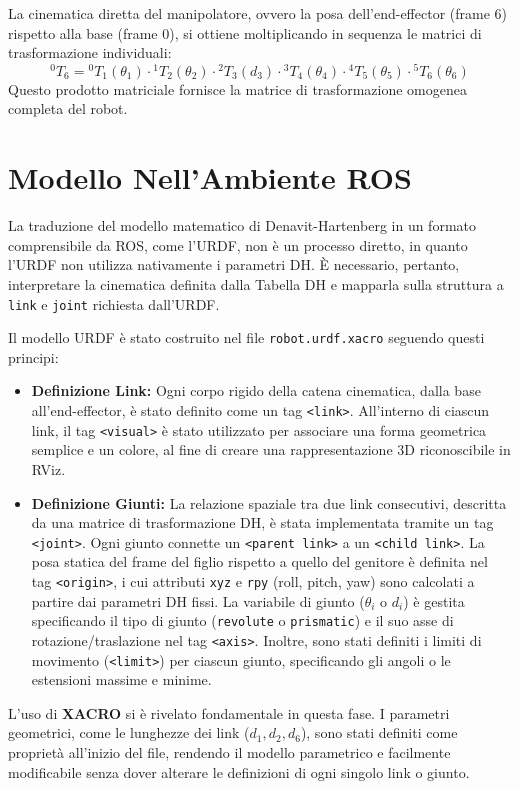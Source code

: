 \documentclass[11pt, a4paper]{report}
\begin{document}
La cinematica diretta del manipolatore, ovvero la posa dell'end-effector (frame 6) rispetto alla base (frame 0), si ottiene moltiplicando in sequenza le matrici di trasformazione individuali:
\[
    ^{0}T_6 = {^{0}T_1}(\theta_1) \cdot {^{1}T_2}(\theta_2) \cdot {^{2}T_3}(d_3) \cdot {^{3}T_4}(\theta_4) \cdot {^{4}T_5}(\theta_5) \cdot {^{5}T_6}(\theta_6)
\]
Questo prodotto matriciale fornisce la matrice di trasformazione omogenea completa del robot.
\newpage
\section{Modello Nell'Ambiente ROS}
\label{sec:implementazione_ros}

La traduzione del modello matematico di Denavit-Hartenberg in un formato comprensibile da ROS, come l'URDF, non è un processo diretto, in quanto l'URDF non utilizza nativamente i parametri DH. È necessario, pertanto, interpretare la cinematica definita dalla Tabella DH e mapparla sulla struttura a \texttt{link} e \texttt{joint} richiesta dall'URDF.

Il modello URDF è stato costruito nel file \texttt{robot.urdf.xacro} seguendo questi principi:
\begin{itemize}
    \item \textbf{Definizione Link:} Ogni corpo rigido della catena cinematica, dalla base all'end-effector, è stato definito come un tag \texttt{<link>}. All'interno di ciascun link, il tag \texttt{<visual>} è stato utilizzato per associare una forma geometrica semplice e un colore, al fine di creare una rappresentazione 3D riconoscibile in RViz.
    \item \textbf{Definizione Giunti:} La relazione spaziale tra due link consecutivi, descritta da una matrice di trasformazione DH, è stata implementata tramite un tag \texttt{<joint>}. Ogni giunto connette un \texttt{<parent link>} a un \texttt{<child link>}. La posa statica del frame del figlio rispetto a quello del genitore è definita nel tag \texttt{<origin>}, i cui attributi \texttt{xyz} e \texttt{rpy} (roll, pitch, yaw) sono calcolati a partire dai parametri DH fissi. La variabile di giunto (\(\theta_i\) o \(d_i\)) è gestita specificando il tipo di giunto (\texttt{revolute} o \texttt{prismatic}) e il suo asse di rotazione/traslazione nel tag \texttt{<axis>}. Inoltre, sono stati definiti i limiti di movimento (\texttt{<limit>}) per ciascun giunto, specificando gli angoli o le estensioni massime e minime.
\end{itemize}
L'uso di \textbf{XACRO} si è rivelato fondamentale in questa fase. I parametri geometrici, come le lunghezze dei link (\(d_1, d_2, d_6\)), sono stati definiti come proprietà all'inizio del file, rendendo il modello parametrico e facilmente modificabile senza dover alterare le definizioni di ogni singolo link o giunto.
\end{document}
